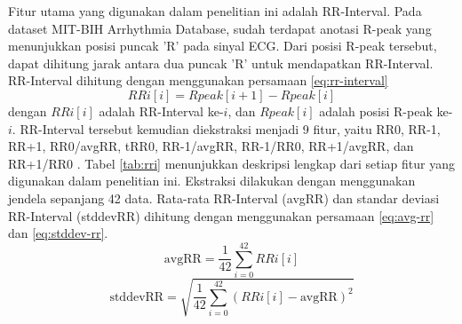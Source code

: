 Fitur utama yang digunakan dalam penelitian ini adalah RR-Interval.
Pada dataset MIT-BIH Arrhythmia Database, sudah terdapat anotasi R-peak yang menunjukkan posisi puncak 'R' pada sinyal ECG.
Dari posisi R-peak tersebut, dapat dihitung jarak antara dua puncak 'R' untuk mendapatkan RR-Interval.
RR-Interval dihitung dengan menggunakan persamaan \ref{eq:rr-interval}
\begin{equation}
		RRi[i] = Rpeak[i+1] - Rpeak[i]
		\label{eq:rr-interval}
\end{equation}
dengan $RRi[i]$ adalah RR-Interval ke-$i$, dan $Rpeak[i]$ adalah posisi R-peak ke-$i$.
RR-Interval tersebut kemudian diekstraksi menjadi 9 fitur, yaitu RR0, RR-1, RR+1, RR0/avgRR, tRR0, RR-1/avgRR, RR-1/RR0, RR+1/avgRR, dan RR+1/RR0 \parencite{pramukantoroHeartbeatClassifierContinuous2022}.
Tabel \ref{tab:rri} menunjukkan deskripsi lengkap dari setiap fitur yang digunakan dalam penelitian ini.
Ekstraksi dilakukan dengan menggunakan jendela sepanjang 42 data. 
Rata-rata RR-Interval (avgRR) dan standar deviasi RR-Interval (stddevRR) dihitung dengan menggunakan persamaan \ref{eq:avg-rr} dan \ref{eq:stddev-rr}.
\begin{equation}
		\text{avgRR} = \frac{1}{42} \sum_{i=0}^{42} RRi[i]
		\label{eq:avg-rr}
\end{equation}
\begin{equation}
		\text{stddevRR} = \sqrt{\frac{1}{42} \sum_{i=0}^{42} (RRi[i] - \text{avgRR})^2}
		\label{eq:stddev-rr}
\end{equation}



